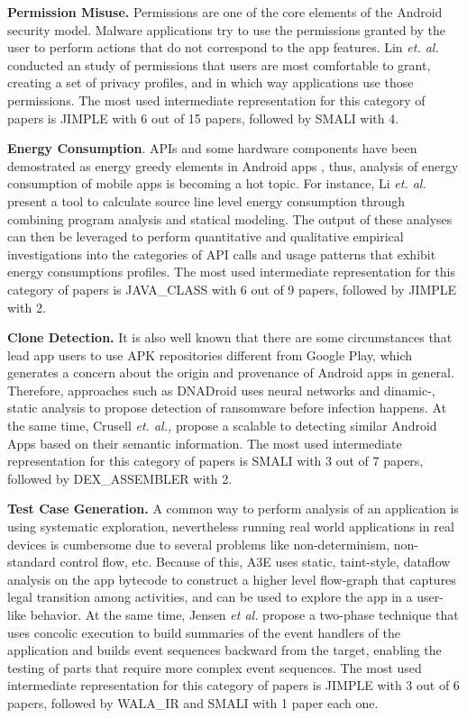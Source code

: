 \textbf{Permission Misuse.} Permissions are one of the core elements of the Android security model. Malware applications try to use the permissions granted by the user to perform actions that do not correspond to the app features. Lin \textit{et. al.} \cite{lin2014modeling} conducted an study of  permissions that users are most comfortable to grant, creating a set of privacy profiles, and in which way applications use those permissions. The most used intermediate representation for this category of papers is JIMPLE with 6 out of 15 papers, followed by SMALI with 4.

\textbf{Energy Consumption}.  APIs and some hardware components have been demostrated as energy greedy elements in Android apps \cite{Linares-Vasquez:2014,Pathak:2011}, thus, analysis of energy consumption of mobile apps is becoming a hot topic. For instance, Li \textit{et. al.} \cite{li:ISSTA2013} present a tool to calculate source line level energy consumption through combining program analysis and statical modeling. The output of these analyses can then be leveraged to perform quantitative and qualitative empirical investigations into the categories of API calls and usage patterns that exhibit energy consumptions profiles. The most used intermediate representation for this category of papers is JAVA\_CLASS with 6 out of 9 papers, followed by JIMPLE with 2.

\textbf{Clone Detection.} It is also well known that there are some circumstances that lead app users to use APK repositories different from Google Play, which generates a concern about the origin and provenance of Android apps in general. Therefore, approaches such as DNADroid\cite{crussell:ESORICS2012} uses neural networks and dinamic-, static analysis to propose detection of ransomware before infection happens. At the same time, Crusell \textit{et. al.,} \cite{crussell:ESORICS2013} propose a scalable to detecting similar Android Apps based on their semantic information. The most used intermediate representation for this category of papers is SMALI with 3 out of 7 papers, followed by DEX\_ASSEMBLER with 2.

\textbf{Test Case Generation.} A common way to perform analysis of an application is using systematic exploration, nevertheless running real world applications in real devices is cumbersome due to several problems like non-determinism, non-standard control flow, etc. Because of this, A3E\cite{azim:OOPSLA2013} uses static, taint-style, dataflow analysis on the app bytecode to construct a higher level flow-graph that captures legal transition among activities, and can be used to explore the app in a user-like behavior. At the same time, Jensen \textit{et al.}\cite{jensen:ISSTA2013} propose a two-phase technique that uses concolic execution to build summaries of the event handlers of the application and builds event sequences backward from the target, enabling the testing of parts that require more complex event sequences. The most used intermediate representation for this category of papers is JIMPLE with 3 out of 6 papers, followed by WALA\_IR and SMALI with 1 paper each one.

